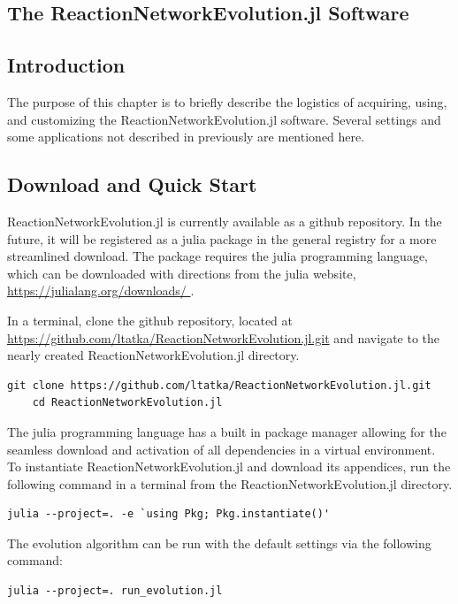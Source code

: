 \documentclass[12pt]{report}
\begin{document}
\begin{appendices}	
\chapter{The ReactionNetworkEvolution.jl Software}

\section{Introduction}
The purpose of this chapter is to briefly describe the logistics of acquiring, using, and customizing the ReactionNetworkEvolution.jl software. Several settings and some applications not described in previously are mentioned here.

\section{Download and Quick Start}
ReactionNetworkEvolution.jl is currently available as a github repository. In the future, it will be registered as a julia package in the general registry for a more streamlined download. The package requires the julia programming language, which can be downloaded with directions from the julia website, \url{https://julialang.org/downloads/ }.

In a terminal, clone the github repository, located at \url{https://github.com/ltatka/ReactionNetworkEvolution.jl.git} and navigate to the nearly created ReactionNetworkEvolution.jl directory.


\begin{Verbatim}[frame=single]
	git clone https://github.com/ltatka/ReactionNetworkEvolution.jl.git
	cd ReactionNetworkEvolution.jl
\end{Verbatim}
The julia programming language has a built in package manager allowing for the seamless download and activation of all dependencies in a virtual environment. To instantiate ReactionNetworkEvolution.jl and download its appendices, run the following command in a terminal from the ReactionNetworkEvolution.jl directory.
\begin{Verbatim}[frame=single]
	julia --project=. -e `using Pkg; Pkg.instantiate()'
\end{Verbatim}

The evolution algorithm can be run with the default settings via the following command:
\begin{Verbatim}[frame=single]
	julia --project=. run_evolution.jl
\end{Verbatim}


\end{appendices}
\end{document}
